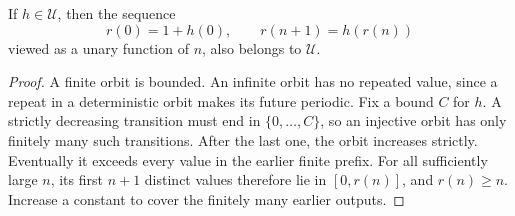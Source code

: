 \begin{lemma}
If $h\in\mathcal U$, then the sequence
\[
 r(0)=1+h(0),\qquad r(n+1)=h(r(n))
\]
viewed as a unary function of $n$, also belongs to $\mathcal U$.
\end{lemma}
\begin{proof}
A finite orbit is bounded. An infinite orbit has no repeated value, since
a repeat in a deterministic orbit makes its future periodic. Fix a bound
$C$ for $h$. A strictly decreasing transition must end in
$\{0,\ldots,C\}$, so an injective orbit has only finitely many such
transitions. After the last one, the orbit increases strictly. Eventually
it exceeds every value in the earlier finite prefix. For all sufficiently
large $n$, its first $n+1$ distinct values therefore lie in
$[0,r(n)]$, and $r(n)\geq n$. Increase a constant to cover the finitely many
earlier outputs.
\end{proof}

